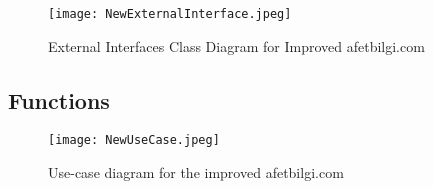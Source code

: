 \documentclass[11pt,a4paper]{article}
\begin{document}
\begin{figure}[H]
    \centering
    \texttt{[image: NewExternalInterface.jpeg]}
    \caption{External Interfaces Class Diagram for Improved afetbilgi.com}
    \label{External Interfaces Class Diagram for Improved afetbilgi.com}
\end{figure}

\newpage

\subsection{Functions}

\begin{figure}[H]
    \centering
    \texttt{[image: NewUseCase.jpeg]}
    \caption{Use-case diagram for the improved afetbilgi.com}
    \label{Use-case diagram for improved afetbilgi.com}
\end{figure}
\end{document}
